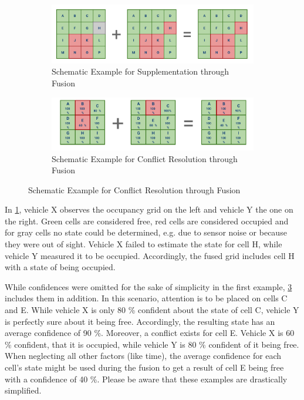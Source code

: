 \begin{figure}[h]
	\centering
	\begin{subfigure}[b]{1\textwidth}
		\includegraphics[width=0.9\linewidth]{98_images/fusion_goals_ex1}
		\caption{Schematic Example for Supplementation through Fusion}
		\label{fig:fusion_goals_1}
	\end{subfigure}
	
	\begin{subfigure}[b]{1\textwidth}
		\includegraphics[width=0.89\linewidth]{98_images/fusion_goals_ex2}
		\caption{Schematic Example for Conflict Resolution through Fusion}
		\label{fig:fusion_goals_2}
	\end{subfigure}
\end{figure}

In \cref{fig:fusion_goals_1}, vehicle X observes the occupancy grid on the left and vehicle Y the one on the right. Green cells are considered free, red cells are considered occupied and for gray cells no state could be determined, e.g. due to sensor noise or because they were out of sight. Vehicle X failed to estimate the state for cell H, while vehicle Y measured it to be occupied. Accordingly, the fused grid includes cell H with a state of being occupied.

While confidences were omitted for the sake of simplicity in the first example, \cref{fig:fusion_goals_2} includes them in addition. In this scenario, attention is to be placed on cells C and E. While vehicle X is only 80 \% confident about the state of cell C, vehicle Y is perfectly sure about it being free. Accordingly, the resulting state has an average confidence of 90 \%. Moreover, a conflict exists for cell E. Vehicle X is 60 \% confident, that it is occupied, while vehicle Y is 80 \% confident of it being free. When neglecting all other factors (like time), the average confidence for each cell's state might be used during the fusion to get a result of cell E being free with a confidence of 40 \%. Please be aware that these examples are drastically simplified.

